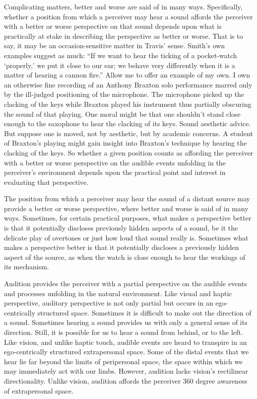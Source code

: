 Complicating matters, better and worse are said of in many ways. Specifically, whether a position from which a perceiver may hear a sound affords the perceiver with a better or worse perspective on that sound depends upon what is practically at stake in describing the perspective as better or worse. That is to say, it may be an occasion-sensitive matter in Travis' \citeyearpar{Travis:2008la} sense. Smith's own examples suggest as much: ``If we want to hear the ticking of a pocket-watch `properly,' we put it close to our ear; we behave very differently when it is a matter of hearing a cannon fire.'' Allow me to offer an example of my own. I own an otherwise fine recording of an Anthony Braxton solo performance marred only by the ill-judged positioning of the microphone. The microphone picked up the clacking of the keys while Braxton played his instrument thus partially obscuring the sound of that playing. One moral might be that one shouldn't stand close enough to the saxophone to hear the clacking of its keys. Sound aesthetic advice. But suppose one is moved, not by aesthetic, but by academic concerns. A student of Braxton's playing might gain insight into Braxton's technique by hearing the clacking of the keys. So whether a given position counts as affording the perceiver with a better or worse perspective on the audible events unfolding in the perceiver's environment depends upon the practical point and interest in evaluating that perspective.

The position from which a perceiver may hear the sound of a distant source may provide a better or worse perspective, where better and worse is said of in many ways. Sometimes, for certain practical purposes, what makes a perspective better is that it potentially discloses previously hidden aspects of a sound, be it the delicate play of overtones or just how loud that sound really is. Sometimes what makes a perspective better is that it potentially discloses a previously hidden aspect of the source, as when the watch is close enough to hear the workings of its mechanism. 

Audition provides the perceiver with a partial perspective on the audible events and processes unfolding in the natural environment. Like visual and haptic perspective, auditory perspective is not only partial but occurs in an ego-centrically structured space. Sometimes it is difficult to make out the direction of a sound. Sometimes hearing a sound provides us with only a general sense of its direction. Still, it is possible for us to hear a sound from behind, or to the left. Like vision, and unlike haptic touch, audible events are heard to transpire in an ego-centrically structured extrapersonal space. Some of the distal events that we hear lie far beyond the limits of peripersonal space, the space within which we may immediately act with our limbs. However, audition lacks vision's rectilinear directionality. Unlike vision, audition affords the perceiver 360 degree awareness of extrapersonal space. 

